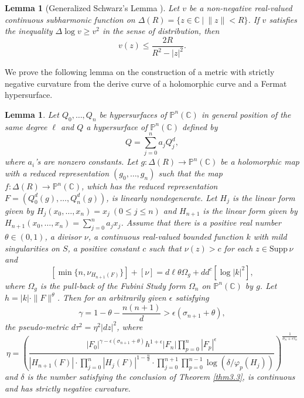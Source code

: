 \documentclass[12pt,article]{amsart}
\newtheorem{lemma}[equation]{Lemma}
\newcommand{\C}{{\mathbb{C}}}
\renewcommand{\P}{{\mathbb{P}}}
\newcommand{\supp}{\mathrm{Supp}\,}
\numberwithin{equation}{section}
\begin{document}
\begin{lemma}[{Generalized Schwarz's Lemma \cite{A38}}]\label{lem3.6}  
Let $v$ be a non-negative real-valued continuous subharmonic function on $\Delta (R)=\{z\in\C\ |\ \|z\|<R\}$. If $v$ satisfies the inequality $\Delta\log v\ge v^2$ in the sense of distribution, then
$$v(z) \le \dfrac{2R}{R^2-|z|^2}.$$
\end{lemma}

We prove the following lemma on the construction of a metric with strictly negative curvature from the derive curve of a holomorphic curve and a Fermat hypersurface.
\begin{lemma}\label{lem3.7} 
Let $Q_0,\ldots,Q_n$ be hypersurfaces of $\P^n(\C)$ in general position of the same degree $\ell$ and $Q$ a hypersurface of $\P^n(\C)$ defined by
$$Q=\sum_{j=0}^na_{j}Q_j^d,$$
where $a_i$'s are nonzero constants. Let $g:\Delta (R)\rightarrow \P^n(\C)$ be a holomorphic map with a reduced representation $(g_0,\ldots,g_n)$ such that the map $f:\Delta (R)\rightarrow \P^n(\C)$, which has the reduced representation $F=(Q_0^d(g),\ldots,Q_n^d(g))$, is linearly nondegenerate. Let $H_j$ is the linear form given by $H_j(x_0,\ldots,x_n)=x_j\ (0\le j\le n)$ and $H_{n+1}$ is the linear form given by $H_{n+1}(x_0,\ldots,x_n)=\sum_{j=0}^na_jx_j$. Assume that there is a positive real number $\theta\in (0,1)$, a divisor $\nu$, a continuous real-valued bounded function $k$ with mild singularities on $S$, a positive constant $c$ such that $\nu(z)>c$ for each $z\in\supp \nu$ and
$$ [\min\{n,\nu_{H_{n+1}(F)}\}]+[\nu]=d\ell\theta \Omega_g+dd^c[\log|k|^2],$$
where $\Omega_g$ is the pull-back of the Fubini Study form $\Omega_n$ on $\P^n(\C)$ by $g$. Let $h=|k|\cdot \|F\|^\theta$. Then for an arbitrarily given $\epsilon$ satisfying 
$$\gamma=1-\theta-\frac{n(n+1)}{d}>\epsilon\left(\sigma_{n+1}+\theta\right),$$ 
the pseudo-metric $d\tau^2=\eta^2|dz|^2$, where
$$ \eta=\left(\dfrac{|F_{0}|^{\gamma-\epsilon\left(\sigma_{n+1}+\theta\right)}h^{1+\epsilon}|F_n|\prod_{p=0}^{n}|F_{p}|^{\epsilon}}{|H_{n+1}(F)|\cdot\prod_{j=0}^{n}|H_j(F)|^{1-\frac{n}{d}}\cdot\prod_{j=0}^{n+1}\prod_{p=0}^{n-1}\log (\delta/\varphi_{p}(H_j))}\right )^{\frac{1}{\sigma_n+\epsilon\tau_n}}$$
and $\delta$ is the number satisfying the conclusion of Theorem \ref{thm3.3}, is continuous and has strictly negative curvature.
\end{lemma}
\end{document}
